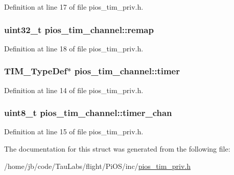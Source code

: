 \-Definition at line 17 of file pios\-\_\-tim\-\_\-priv.\-h.

\hypertarget{structpios__tim__channel_ac0c7199f77fa4e99068cda8572e02064}{
\subsubsection[{remap}]{\setlength{\rightskip}{0pt plus 5cm}uint32\-\_\-t {\bf pios\-\_\-tim\-\_\-channel\-::remap}}}\label{structpios__tim__channel_ac0c7199f77fa4e99068cda8572e02064}


\-Definition at line 18 of file pios\-\_\-tim\-\_\-priv.\-h.

\hypertarget{structpios__tim__channel_a07d1ffb5da40643ef9938fa9c4fad017}{
\subsubsection[{timer}]{\setlength{\rightskip}{0pt plus 5cm}\-T\-I\-M\-\_\-\-Type\-Def$\ast$ {\bf pios\-\_\-tim\-\_\-channel\-::timer}}}\label{structpios__tim__channel_a07d1ffb5da40643ef9938fa9c4fad017}


\-Definition at line 14 of file pios\-\_\-tim\-\_\-priv.\-h.

\hypertarget{structpios__tim__channel_a66cede40f7ef0785c0941c49ea162b59}{
\subsubsection[{timer\-\_\-chan}]{\setlength{\rightskip}{0pt plus 5cm}uint8\-\_\-t {\bf pios\-\_\-tim\-\_\-channel\-::timer\-\_\-chan}}}\label{structpios__tim__channel_a66cede40f7ef0785c0941c49ea162b59}


\-Definition at line 15 of file pios\-\_\-tim\-\_\-priv.\-h.



\-The documentation for this struct was generated from the following file\-:\begin{DoxyCompactItemize}
\item 
/home/jb/code/\-Tau\-Labs/flight/\-Pi\-O\-S/inc/\hyperlink{pios__tim__priv_8h}{pios\-\_\-tim\-\_\-priv.\-h}\end{DoxyCompactItemize}
